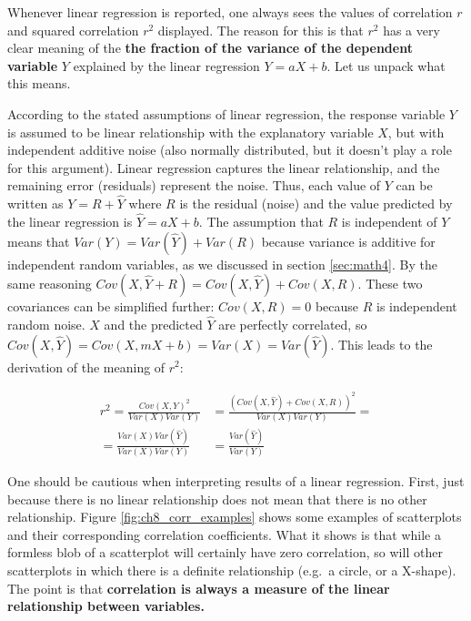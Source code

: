\documentclass[
  letterpaper,
  DIV=11,
  numbers=noendperiod]{scrreprt}
\begin{document}
Whenever linear regression is reported, one always sees the values of
correlation \(r\) and squared correlation \(r^2\) displayed. The reason
for this is that \(r^2\) has a very clear meaning of the \textbf{the
fraction of the variance of the dependent variable} \(Y\) explained by
the linear regression \(Y=aX+b\). Let us unpack what this means.

According to the stated assumptions of linear regression, the response
variable \(Y\) is assumed to be linear relationship with the explanatory
variable \(X\), but with independent additive noise (also normally
distributed, but it doesn't play a role for this argument). Linear
regression captures the linear relationship, and the remaining error
(residuals) represent the noise. Thus, each value of \(Y\) can be
written as \(Y = R + \hat Y\) where \(R\) is the residual (noise) and
the value predicted by the linear regression is \(\hat Y =aX+b\). The
assumption that \(R\) is independent of \(Y\) means that
\(Var(Y) = Var (\hat Y) + Var (R)\) because variance is additive for
independent random variables, as we discussed in section
\ref{sec:math4}. By the same reasoning
\(Cov(X,\hat Y + R) = Cov(X,\hat Y) + Cov(X,R)\). These two covariances
can be simplified further: \(Cov(X,R) = 0\) because \(R\) is independent
random noise. \(X\) and the predicted \(\hat Y\) are perfectly
correlated, so \(Cov(X,\hat Y) = Cov(X,mX+b) = Var(X) = Var(\hat Y)\).
This leads to the derivation of the meaning of \(r^2\):

\begin{equation}
\begin{aligned}
  r^2 = \frac{Cov(X,Y)^2}{Var(X) Var(Y)} &=   \frac{(Cov(X,\hat Y) + Cov(X,R) )^2}{Var(X) Var(Y)}   = \\
  =\frac{Var(X)Var(\hat Y)}{Var(X) Var(Y)} &=  \frac{Var(\hat Y)}{Var(Y)}
  \end{aligned}
\label{eq:ch8_frac_var}
\end{equation}

One should be cautious when interpreting results of a linear regression.
First, just because there is no linear relationship does not mean that
there is no other relationship. Figure \ref{fig:ch8_corr_examples} shows
some examples of scatterplots and their corresponding correlation
coefficients. What it shows is that while a formless blob of a
scatterplot will certainly have zero correlation, so will other
scatterplots in which there is a definite relationship (e.g.~a circle,
or a X-shape). The point is that \textbf{correlation is always a measure
of the linear relationship between variables.}
\end{document}
